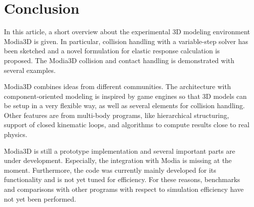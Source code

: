 \section{Conclusion}\label{sec:conclusion}
In this article, a short overview about the experimental 3D modeling environment Modia3D is given.
In particular, collision handling with a variable-step solver has been sketched
and a novel formulation for elastic response calculation is proposed.
The Modia3D collision and contact handling is demonstrated with several examples. 

Modia3D combines ideas from different communities. The architecture with component-oriented modeling
is inspired by game engines so that 3D models can be setup in a very flexible way, as well as several elements for collision handling.
Other features are from multi-body programs, like hierarchical structuring, support of closed kinematic loops, and algorithms to compute results close to real physics.

Modia3D is still a prototype implementation and several important parts are under development. Especially, the integration with Modia is missing at the moment. Furthermore, the code was currently mainly developed for its functionality and is not yet tuned for efficiency. For these reasons,
benchmarks and comparisons with other programs with respect to
simulation efficiency have not yet been performed.
